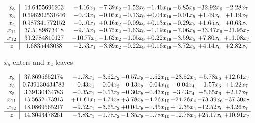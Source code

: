 \documentclass[8pt]{article}
\begin{document}
 \[\begin{array}{c| c c@{\hskip 2pt} c@{\hskip 2pt} c@{\hskip 2pt} c@{\hskip 2pt} c@{\hskip 2pt} c@{\hskip 2pt} c@{\hskip 2pt} }
 x_{8}   &  14.6455696203 & +  4.16 x_{1} & -7.39 x_{2} & +  1.52 x_{9} & -1.46 x_{10} & +  6.85 x_{5} & -32.92 x_{6} & -2.28 x_{7}\\
 x_{3}   &  0.696202531646 & -0.43 x_{1} & -0.05 x_{2} & -0.13 x_{9} & +  0.04 x_{10} & +  0.01 x_{5} & +  1.49 x_{6} & +  1.19 x_{7}\\
 x_{4}   &  0.987341772152 & -0.10 x_{1} & +  0.16 x_{2} & -0.09 x_{9} & +  0.13 x_{10} & -0.29 x_{5} & +  1.65 x_{6} & +  0.63 x_{7}\\
 x_{11}   &  37.5189873418 & +  9.15 x_{1} & -0.75 x_{2} & +  1.63 x_{9} & -1.19 x_{10} & -7.06 x_{5} & -33.47 x_{6} & -21.95 x_{7}\\
 x_{12}   &  30.2784810127 & -10.77 x_{1} & -1.62 x_{2} & -1.05 x_{9} & +  0.22 x_{10} & -3.59 x_{5} & +  7.80 x_{6} & + 11.08 x_{7}\\
\hline
z    &  1.6835443038 & -2.53 x_{1} & -3.89 x_{2} & -0.22 x_{9} & +  0.16 x_{10} & +  3.72 x_{5} & +  4.14 x_{6} & +  2.82 x_{7}\\
\end{array}\]


 $ x_{5} $ enters and $ x_{4} $ leaves 

 \[\begin{array}{c| c c@{\hskip 2pt} c@{\hskip 2pt} c@{\hskip 2pt} c@{\hskip 2pt} c@{\hskip 2pt} c@{\hskip 2pt} c@{\hskip 2pt} }
 x_{8}   &  37.8695652174 & +  1.78 x_{1} & -3.52 x_{2} & -0.57 x_{9} & +  1.52 x_{10} & -23.52 x_{4} & +  5.78 x_{6} & + 12.61 x_{7}\\
 x_{3}   &  0.739130434783 & -0.43 x_{1} & -0.04 x_{2} & -0.13 x_{9} & +  0.04 x_{10} & -0.04 x_{4} & +  1.57 x_{6} & +  1.22 x_{7}\\
 x_{5}   &  3.39130434783 & -0.35 x_{1} & +  0.57 x_{2} & -0.30 x_{9} & +  0.43 x_{10} & -3.43 x_{4} & +  5.65 x_{6} & +  2.17 x_{7}\\
 x_{11}   &  13.5652173913 & + 11.61 x_{1} & -4.74 x_{2} & +  3.78 x_{9} & -4.26 x_{10} & + 24.26 x_{4} & -73.39 x_{6} & -37.30 x_{7}\\
 x_{12}   &  18.0869565217 & -9.52 x_{1} & -3.65 x_{2} & +  0.04 x_{9} & -1.35 x_{10} & + 12.35 x_{4} & -12.52 x_{6} & +  3.26 x_{7}\\
\hline
z    &  14.3043478261 & -3.83 x_{1} & -1.78 x_{2} & -1.35 x_{9} & +  1.78 x_{10} & -12.78 x_{4} & + 25.17 x_{6} & + 10.91 x_{7}\\
\end{array}\]
\end{document}
